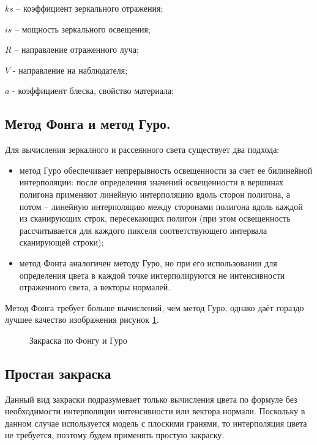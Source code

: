 \documentclass[a4paper,14pt]{report}
\begin{document}
$ks$ – коэффициент зеркального отражения;

$is$ – мощность зеркального освещения;

$R$ – направление отраженного луча;

$V$ - направление на наблюдателя;

$a$ - коэффициент блеска, свойство материала;

\subsection{Метод Фонга и метод Гуро.}
Для вычисления зеркалного и рассеянного света существует два подхода:
\begin{itemize}
 \item метод Гуро обеспечивает непрерывность освещенности за счет ее билинейной интерполяции: после определения значений освещенности в вершинах полигона применяют линейную интерполяцию вдоль сторон полигона, а потом – линейную интерполяцию между сторонами полигона вдоль каждой из сканирующих строк, пересекающих полигон (при этом освещенность рассчитывается для каждого пикселя соответствующего интервала сканирующей строки);
    \item метод Фонга аналогичен методу Гуро, но при его использовании для определения цвета в каждой точке интерполируются не интенсивности отраженного света, а векторы нормалей.
\end{itemize}
    Метод Фонга требует больше вычислений, чем метод Гуро, однако даёт гораздо лучшее качество изображения рисунок \ref{fig:fong}.
    \begin{figure}[H]
 \caption{Закраска по Фонгу и Гуро}
 \label{fig:fong}
\end{figure}
    
                              

\subsection{Простая закраска}
Данный вид закраски подразумевает только вычисления цвета по формуле без необходимости интерполяции интенсивности или вектора нормали.
Поскольку в данном случае используется модель с плоскими гранями, то интерполяция цвета не требуется, поэтому будем применять простую закраску.
\end{document}
